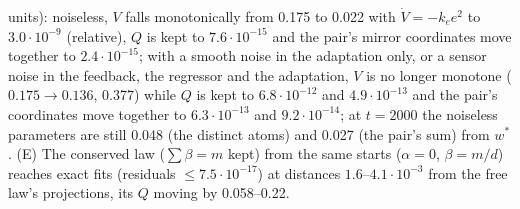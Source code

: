 \begin{sloppypar}
units): noiseless, $V$ falls monotonically from 0.175 to 0.022 with $\dot V = -k_ee^2$ to $3.0\cdot10^{-9}$
(relative), $Q$ is kept to $7.6\cdot10^{-15}$ and the pair's mirror coordinates move together to $2.4\cdot10^{-15}$;
with a smooth noise in the adaptation only, or a sensor noise in the feedback, the regressor and the adaptation, $V$ is
no longer monotone ($0.175\to0.136$, 0.377) while $Q$ is kept to $6.8\cdot10^{-12}$ and $4.9\cdot10^{-13}$ and the
pair's coordinates move together to $6.3\cdot10^{-13}$ and $9.2\cdot10^{-14}$; at $t = 2000$ the noiseless parameters
are still 0.048 (the distinct atoms) and 0.027 (the pair's sum) from $w^*$. (E) The conserved law ($\sum\beta = m$
kept) from the same starts ($\alpha = 0$, $\beta = m/d$) reaches exact fits (residuals $\le7.5\cdot10^{-17}$) at
distances $1.6$--$4.1\cdot10^{-3}$ from the free law's projections, its $Q$ moving by 0.058--0.22.
\end{sloppypar}

